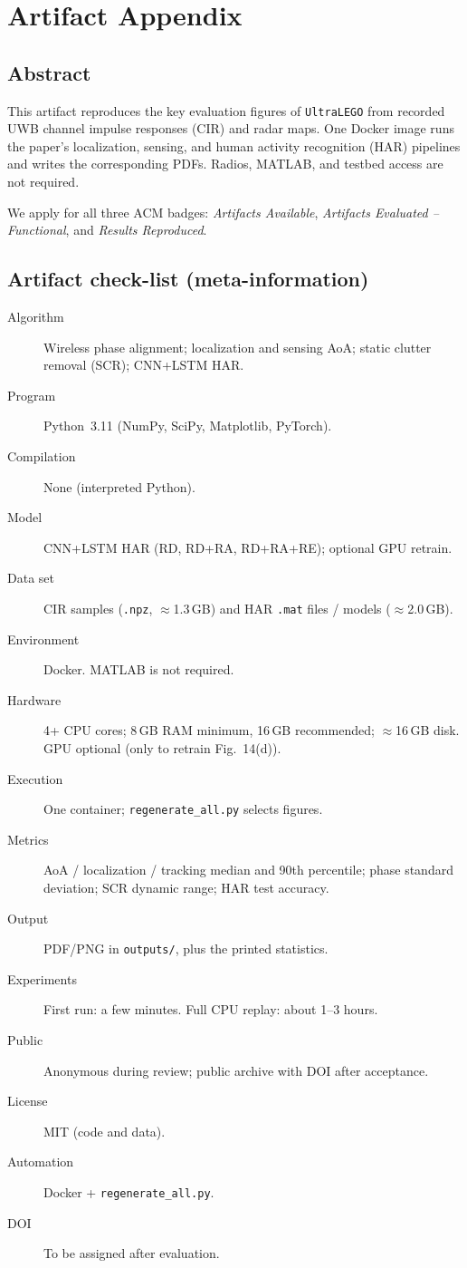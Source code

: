 \documentclass[10pt,twocolumn]{article}
\begin{document}
\section*{Artifact Appendix}

\subsection{Abstract}

This artifact reproduces the key evaluation figures of
\texttt{UltraLEGO} from recorded UWB channel impulse responses (CIR)
and radar maps. One Docker image runs the paper's localization, sensing,
and human activity recognition (HAR) pipelines and writes the
corresponding PDFs. Radios, MATLAB, and testbed access are not required.

We apply for all three ACM badges:
\textit{Artifacts Available},
\textit{Artifacts Evaluated -- Functional}, and
\textit{Results Reproduced}.

\subsection{Artifact check-list (meta-information)}

{\small
\begin{description}
  \item[Algorithm]
    Wireless phase alignment; localization and sensing AoA;
    static clutter removal (SCR); CNN+LSTM HAR.
  \item[Program]
    Python~3.11 (NumPy, SciPy, Matplotlib, PyTorch).
  \item[Compilation]
    None (interpreted Python).
  \item[Model]
    CNN+LSTM HAR (RD, RD+RA, RD+RA+RE); optional GPU retrain.
  \item[Data set]
    CIR samples (\texttt{.npz}, $\approx$1.3\,GB) and HAR
    \texttt{.mat} files / models ($\approx$2.0\,GB).
  \item[Environment]
    Docker. MATLAB is not required.
  \item[Hardware]
    4+ CPU cores; 8\,GB RAM minimum, 16\,GB recommended;
    $\approx$16\,GB disk. GPU optional (only to retrain Fig.~14(d)).
  \item[Execution]
    One container; \texttt{regenerate\_all.py} selects figures.
  \item[Metrics]
    AoA / localization / tracking median and 90th percentile;
    phase standard deviation; SCR dynamic range; HAR test accuracy.
  \item[Output]
    PDF/PNG in \texttt{outputs/}, plus the printed statistics.
  \item[Experiments]
    First run: a few minutes. Full CPU replay: about 1--3 hours.
  \item[Public]
    Anonymous during review; public archive with DOI after acceptance.
  \item[License]
    MIT (code and data).
  \item[Automation]
    Docker + \texttt{regenerate\_all.py}.
  \item[DOI]
    To be assigned after evaluation.
\end{description}
}
\end{document}
